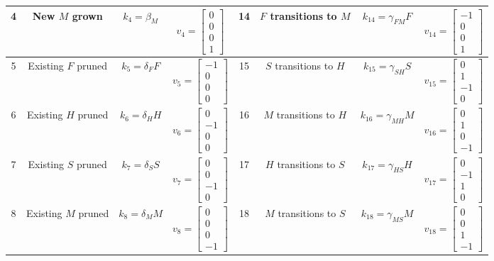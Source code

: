 \documentclass[11pt,letterpaper, onecolumn]{exam}
\begin{document}
\begin{table}[h!]
{\begin{tabular}{|c|c|c|c||c|c|c|c|}
\hline
4 & New $M$ grown & $k_4=\beta_M$ & $v_4=\begin{bmatrix}0\\0\\0\\1\end{bmatrix}$ & 14 & $F$ transitions to $M$ & $k_{14}=\gamma_{FM}F$ & $v_{14}=\begin{bmatrix}-1\\0\\0\\1\end{bmatrix}$\\
\hline
5 & Existing $F$ pruned & $k_5=\delta_FF$ & $v_5=\begin{bmatrix}-1\\0\\0\\0\end{bmatrix}$ & 15 & $S$ transitions to $H$ & $k_{15}=\gamma_{SH}S$ & $v_{15}=\begin{bmatrix}0\\1\\-1\\0\end{bmatrix}$\\
\hline
6 & Existing $H$ pruned & $k_6=\delta_HH$ & $v_6=\begin{bmatrix}0\\-1\\0\\0\end{bmatrix}$ & 16 & $M$ transitions to $H$ & $k_{16}=\gamma_{MH}M$ & $v_{16}=\begin{bmatrix}0\\1\\0\\-1\end{bmatrix}$\\
\hline
7 & Existing $S$ pruned & $k_7=\delta_SS$ & $v_7=\begin{bmatrix}0\\0\\-1\\0\end{bmatrix}$ & 17 & $H$ transitions to $S$ & $k_{17}=\gamma_{HS}H$ & $v_{17}=\begin{bmatrix}0\\-1\\1\\0\end{bmatrix}$\\
\hline
8 & Existing $M$ pruned & $k_8=\delta_MM$ & $v_8=\begin{bmatrix}0\\0\\0\\-1\end{bmatrix}$ & 18 & $M$ transitions to $S$ & $k_{18}=\gamma_{MS}M$ & $v_{18}=\begin{bmatrix}0\\0\\1\\-1\end{bmatrix}$\\

\end{tabular}}
\end{table}
\end{document}
